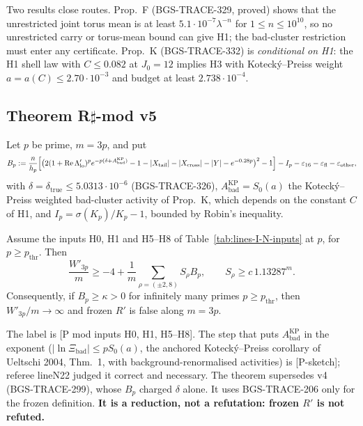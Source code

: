 Two results close routes. Prop.~F (BGS-TRACE-329, proved) shows that the unrestricted joint torus mean is at least \(5.1\cdot10^{-7}\lambda^{-n}\) for \(1\le n\le10^{10}\), so no unrestricted carry or torus-mean bound can give H1; the bad-cluster restriction must enter any certificate. Prop.~K (BGS-TRACE-332) is \emph{conditional on H1}: the H1 shell law with \(C\le0.082\) at \(J_0=12\) implies H3 with Kotecký--Preiss weight \(a=a(C)\le2.70\cdot10^{-3}\) and budget at least \(2.738\cdot10^{-4}\).

\subsection{Theorem R\texorpdfstring{$\sharp$}{\#}-mod v5}
\label{sec:lines-I-N-main}
Let \(p\) be prime, \(m=3p\), and put
\[
B_p:=\frac{n}{h_p}\Bigl[\bigl(2(1+\operatorname{Re}\Lambda'_{\mathrm{lo}})^pe^{-p(\delta+A^{\mathrm{KP}}_{\mathrm{bad}})}-1-\lvert X_{\mathrm{tail}}\rvert-\lvert X_{\mathrm{cross}}\rvert-\lvert Y\rvert-e^{-0.28p}\bigr)^2-1\Bigr]-I_p-\varepsilon_{16}-\varepsilon_{\mathrm{fl}}-\varepsilon_{\mathrm{other}},
\]
with \(\delta=\delta_{\mathrm{true}}\le5.0313\cdot10^{-6}\) (BGS-TRACE-326), \(A^{\mathrm{KP}}_{\mathrm{bad}}=S_0(a)\) the Kotecký--Preiss weighted bad-cluster activity of Prop.~K, which depends on the constant \(C\) of H1, and \(I_p=\sigma(K_p)/K_p-1\), bounded by Robin's inequality.
\begin{theorem}
\label{thm:lines-I-N-rsharp-v5}
Assume the inputs H0, H1 and H5--H8 of Table~\ref{tab:lines-I-N-inputs} at \(p\), for \(p\ge p_{\mathrm{thr}}\). Then
\[
\frac{W'_{3p}}{m}\ge-4+\frac1m\sum_{\rho=(\pm2,8)}S_\rho B_p,\qquad S_\rho\ge c\,1.13287^m .
\]
Consequently, if \(B_p\ge\kappa>0\) for infinitely many primes \(p\ge p_{\mathrm{thr}}\), then \(W'_{3p}/m\to\infty\) and frozen \(R'\) is false along \(m=3p\).
\end{theorem}
The label is [P mod inputs H0, H1, H5--H8]. The step that puts \(A^{\mathrm{KP}}_{\mathrm{bad}}\) in the exponent (\(\lvert\ln\Xi_{\mathrm{bad}}\rvert\le pS_0(a)\), the anchored Kotecký--Preiss corollary of Ueltschi 2004, Thm.~1, with background-renormalised activities) is [P-sketch]; referee lineN22 judged it correct and necessary. The theorem supersedes v4 (BGS-TRACE-299), whose \(B_p\) charged \(\delta\) alone. It uses BGS-TRACE-206 only for the frozen definition. \textbf{It is a reduction, not a refutation: frozen \(R'\) is not refuted.}

